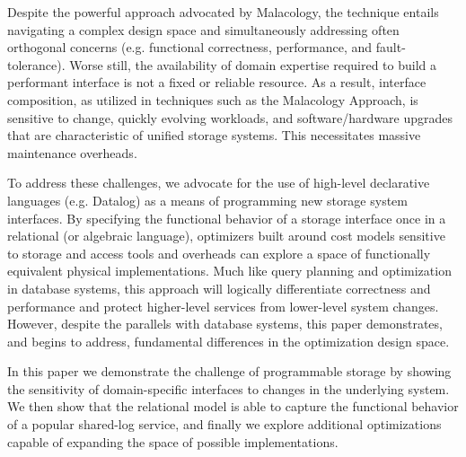 Despite the powerful approach advocated by Malacology, the technique entails navigating 
a complex design space and simultaneously addressing often orthogonal
concerns (e.g. functional correctness, performance, and fault-tolerance).
Worse still, the availability of domain expertise required to build a performant interface is not a fixed or reliable resource. 
As a result, interface composition, as utilized in techniques such as the Malacology Approach, is sensitive to
change, quickly evolving workloads, and software/hardware upgrades that are characteristic of unified storage systems.
This necessitates massive maintenance overheads.

To address these challenges, we advocate for the use of high-level declarative
languages (e.g. Datalog) as a means of programming new storage system
interfaces.  By specifying the functional behavior of a storage interface once
in a relational (or algebraic language), optimizers built around cost models
sensitive to storage and access tools and overheads can explore a space of
functionally equivalent physical implementations. Much like query planning and
optimization in database systems, this approach will logically differentiate
correctness and performance and protect higher-level services from lower-level
system changes. However, despite the parallels with database systems, this
paper demonstrates, and begins to address, fundamental differences in the
optimization design space.

In this paper we demonstrate the challenge of programmable storage by showing
the sensitivity of domain-specific interfaces to changes in the underlying
system. We then show that the relational model is able to capture the
functional behavior of a popular shared-log service, and finally we explore
additional optimizations capable of expanding the space of
possible implementations.
